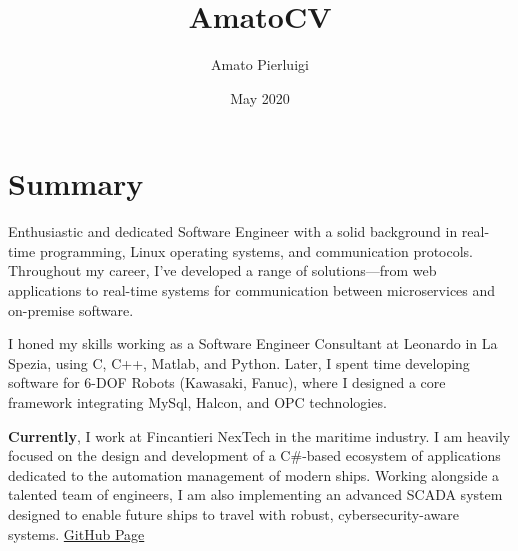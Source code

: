 \documentclass{article}
\title{AmatoCV}
\author{Amato Pierluigi}
\date{May 2020}
\begin{document}
\makecvtitle 

\section{Summary}
Enthusiastic and dedicated Software Engineer with a solid background in real-time programming, Linux operating systems, and communication protocols. Throughout my career, I've developed a range of solutions—from web applications to real-time systems for communication between microservices and on-premise software.

I honed my skills working as a Software Engineer Consultant at Leonardo in La Spezia, using C, C++, Matlab, and Python. Later, I spent time developing software for 6-DOF Robots (Kawasaki, Fanuc), where I designed a core framework integrating MySql, Halcon, and OPC technologies.

\textbf{Currently}, I work at Fincantieri NexTech in the maritime industry. I am heavily focused on the design and development of a C\#-based ecosystem of applications dedicated to the automation management of modern ships. Working alongside a talented team of engineers, I am also implementing an advanced SCADA system designed to enable future ships to travel with robust, cybersecurity-aware systems. \href{https://giga487.github.io/AmatoSplashPage/}{GitHub Page}
\end{document}
